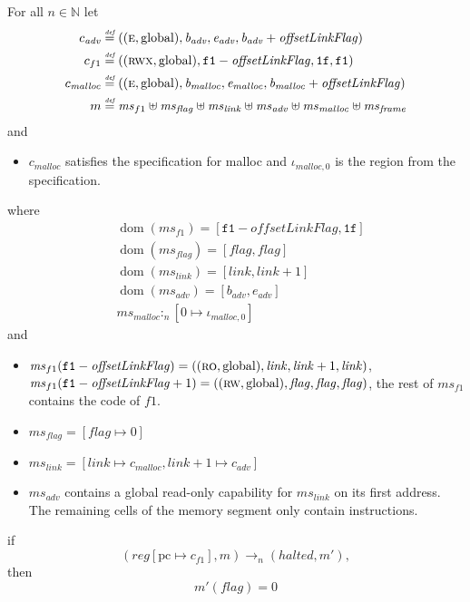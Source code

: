 \documentclass[format=acmsmall, review=true, screen=true]{acmart}
\newcommand{\forcenewline}{$\phantom{v}$\\}
\newcommand{\update}[2]{[#1 \mapsto #2]}
\newcommand{\defeq}{\stackrel{\textit{\tiny{def}}}{=}}
\DeclareMathOperator{\dom}{dom}
\newcommand{\var}[1]{\mathit{#1}}
\newcommand{\hs}{\var{ms}}
\newcommand{\ms}{\hs}
\newcommand{\pcreg}{\mathrm{pc}}
\newcommand{\start}{\var{b}}
\newcommand{\addrend}{\var{e}}
\newcommand{\reg}{\var{reg}}
\newcommand{\heap}{\var{mem}}
\newcommand{\adv}{\var{adv}}
\newcommand{\link}{\var{link}}
\newcommand{\flag}{\var{flag}}
\newcommand{\olf}{\var{offsetLinkFlag}}
\newcommand{\halted}{\mathit{halted}}
\newcommand{\heapSat}[3][\heap]{#1 :_{#2} #3}
\newcommand{\codelabel}[1]{\mathit{#1}}
\newcommand{\malloc}{\codelabel{malloc}}
\newcommand{\nats}{\mathbb{N}}
\newcommand{\plainperm}[1]{\textsc{#1}}
\newcommand{\readonly}{\plainperm{ro}}
\newcommand{\readwrite}{\plainperm{rw}}
\newcommand{\entry}{\plainperm{e}}
\newcommand{\rwx}{\plainperm{rwx}}
\newcommand{\plainlocality}[1]{\mathrm{#1}}
\newcommand{\glob}{\plainlocality{global}}
\newcommand{\step}[1][]{\rightarrow_{#1}}
\begin{document}
\begin{lemma} \forcenewline
  \label{lem:correctness-f1-app}
  For all $n \in \nats$
  let
  \begin{align*}
    c_{\var{adv}} & \defeq ((\entry,\glob),\start_{\adv},\addrend_{\adv},\start_{\adv}+\olf) \\
    c_{f1} & \defeq ((\rwx,\glob),\mathtt{f1}-\olf,\mathtt{1f},\mathtt{f1}) \\
    c_\malloc & \defeq ((\entry,\glob),\start_\malloc,\addrend_\malloc,\start_\malloc+\olf) \\
    m & \defeq \hs_{f1} \uplus 
        \hs_\flag \uplus                
        \ms_{\var{link}} \uplus 
        \hs_\adv \uplus 
        \ms_{\malloc} \uplus 
        \hs_{\var{frame}} 
  \end{align*}
  and
  \begin{itemize}
  \item $c_\malloc$ satisfies the specification for malloc and $\iota_{\malloc,0}$ is the region from the specification.
  \end{itemize}
  where 
  \begin{align*}
    &\dom(\hs_{f1}) = [\mathtt{f1}-\olf,\mathtt{1f}] \\
    &\dom(\hs_\flag) = [\flag,\flag] \\
    &\dom(\ms_\link) = [\link,\link+1]\\
    &\dom(\hs_{\adv}) = [\start_\adv,\addrend_\adv] \\
    &\heapSat[\hs_{\malloc}]{n}{[0 \mapsto \iota_{\malloc,0}]}
  \end{align*}
  and
  \begin{itemize}
  \item $\ms_{f1}(\mathtt{f1}-\olf) = ((\readonly,\glob),\link,\link+1,\link)$, $\ms_{f1}(\mathtt{f1}-\olf+1) = ((\readwrite,\glob),\flag,\flag,\flag)$, the rest of $\hs_{f1}$ contains the code of $f1$.
  \item $\ms_\flag = [\flag \mapsto 0]$
  \item $\ms_{\var{link}} = [\var{link} \mapsto c_\malloc, \var{link} + 1 \mapsto c_\adv]$
  \item $\hs_\adv$ contains a global read-only capability for $\hs_\link$ on its first address. The remaining cells of the memory segment only contain instructions.
  \end{itemize}
  if 
  \[
    (\reg\update{\pcreg}{c_{f1}},m) \step[n] (\halted,m'),
  \]
  then
  \[
    m'(\flag) = 0
  \]  
\end{lemma}
\end{document}
